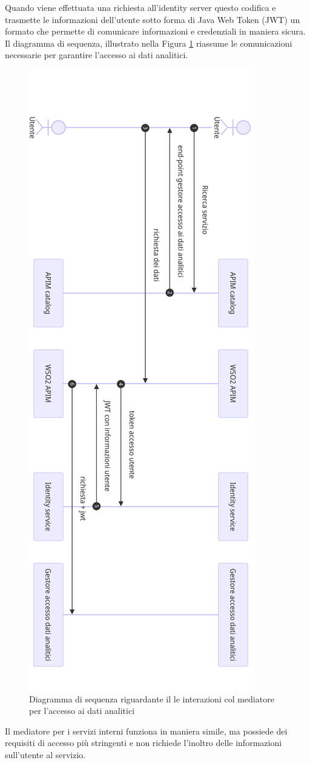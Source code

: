 \documentclass[a4paper,12pt]{report}
\begin{document}
Quando viene effettuata una richiesta all'identity server questo codifica e trasmette le informazioni dell'utente sotto forma di Java Web Token (JWT) \cite{jwt_documentation} un formato che permette di comunicare informazioni e credenziali in maniera sicura.
Il diagramma di sequenza, illustrato nella Figura \ref{funzionamento mediatore} riassume le comunicazioni necessarie per garantire l'accesso ai dati analitici.
\begin{figure}[H]
    \centering
    \includegraphics[width = 0.53\linewidth]{immagini/Funzionamento mediatore dati analitci.png}
    \caption{Diagramma di sequenza riguardante il le interazioni col mediatore per l'accesso ai dati analitici}
    \label{funzionamento mediatore}
\end{figure}
Il mediatore per i servizi interni funziona in maniera simile, ma possiede dei requisiti di accesso più stringenti e non richiede l'inoltro delle informazioni sull'utente al servizio.
\end{document}
